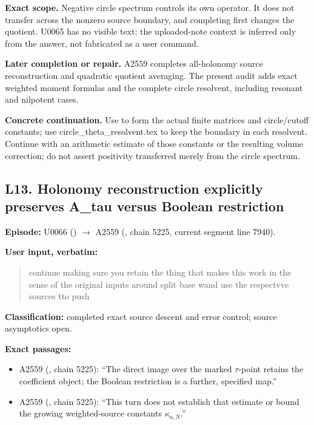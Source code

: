 \textbf{Exact scope.} Negative circle spectrum controls its own
operator. It does not transfer across the nonzero source boundary, and
completing first changes the quotient. U0065 has no visible text; the
uploaded-note context is inferred only from the answer, not fabricated
as a user command.

\textbf{Later completion or repair.} A2559 completes all-holonomy source
reconstruction and quadratic quotient averaging. The present audit adds
exact weighted moment formulas and the complete circle resolvent,
including resonant and nilpotent cases.

\textbf{Concrete continuation.} Use
\protect{} to form the actual
finite matrices and circle/cutoff constants; use
circle\_theta\_resolvent.tex to keep the boundary in each resolvent.
Continue with an arithmetic estimate of those constants or the resulting
volume correction; do not assert positivity transferred merely from the
circle spectrum.

\subsection{L13. Holonomy reconstruction explicitly preserves A\_tau
versus Boolean
restriction}\label{TranscriptLedgerStage:l13.-holonomy-reconstruction-explicitly-preserves-a_tau-versus-boolean-restriction}

\textbf{Episode:} U0066
(\protect{})
\allowbreak{}\ensuremath{→}\allowbreak{} A2559
(\protect{}, chain 5225,
current segment line 7940).

\textbf{User input, verbatim:}

\begin{quote}
continue making sure you retain the thing that makes this work in the
sense of the original inputs around split base wand use the respectvve
sources tto push
\end{quote}

\textbf{Classification:} completed exact source descent and error
control; source asymptotics open.

\textbf{Exact passages:}

\begin{itemize}
\tightlist
\item
  A2559 (\protect{}, chain
  5225): ``The direct image over the marked \(\tau\)-point retains the
  coefficient object; the Boolean restriction is a further, specified
  map.''
\item
  A2559 (\protect{}, chain
  5225): ``This turn does not establish that estimate or bound the
  growing weighted-source constants \(\kappa_{a,N}\).''
\end{itemize}

